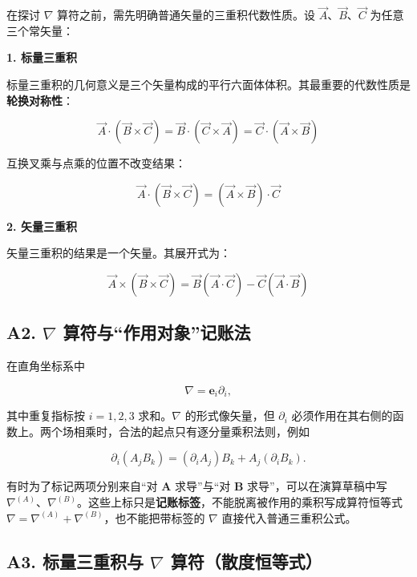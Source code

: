 在探讨 \(\nabla\) 算符之前，需先明确普通矢量的三重积代数性质。设
\(\vec{A}\)、\(\vec{B}\)、\(\vec{C}\) 为任意三个常矢量：

\textbf{1. 标量三重积}

标量三重积的几何意义是三个矢量构成的平行六面体体积。其最重要的代数性质是\textbf{轮换对称性}：

\[
\vec{A} \cdot (\vec{B} \times \vec{C}) = \vec{B} \cdot (\vec{C} \times \vec{A}) = \vec{C} \cdot (\vec{A} \times \vec{B})
\]

互换叉乘与点乘的位置不改变结果：

\[
\vec{A} \cdot (\vec{B} \times \vec{C}) = (\vec{A} \times \vec{B}) \cdot \vec{C}
\]

\textbf{2. 矢量三重积}

矢量三重积的结果是一个矢量。其展开式为：

\[
\vec{A} \times (\vec{B} \times \vec{C}) = \vec{B}(\vec{A} \cdot \vec{C}) - \vec{C}(\vec{A} \cdot \vec{B})
\]

\subsection{\texorpdfstring{A2. \(\nabla\)
算符与``作用对象''记账法}{A2. \textbackslash nabla 算符与``作用对象''记账法}}\label{m1:a2.-nabla-ux7b97ux7b26ux4e0eux4f5cux7528ux5bf9ux8c61ux8bb0ux8d26ux6cd5}

在直角坐标系中

\[
\nabla=\mathbf e_i\partial_i,
\]

其中重复指标按 \(i=1,2,3\) 求和。\(\nabla\) 的形式像矢量，但
\(\partial_i\)
必须作用在其右侧的函数上。两个场相乘时，合法的起点只有逐分量乘积法则，例如

\[
\partial_i(A_jB_k)=(\partial_iA_j)B_k+A_j(\partial_iB_k).
\]

有时为了标记两项分别来自``对 \(\mathbf A\) 求导''与``对 \(\mathbf B\)
求导''，可以在演算草稿中写
\(\nabla^{(A)}\)、\(\nabla^{(B)}\)。这些上标只是\textbf{记账标签}，不能脱离被作用的乘积写成算符恒等式
\(\nabla=\nabla^{(A)}+\nabla^{(B)}\)，也不能把带标签的 \(\nabla\)
直接代入普通三重积公式。

\subsection{\texorpdfstring{A3. 标量三重积与 \(\nabla\)
算符（散度恒等式）}{A3. 标量三重积与 \textbackslash nabla 算符（散度恒等式）}}\label{m1:a3.-ux6807ux91cfux4e09ux91cdux79efux4e0e-nabla-ux7b97ux7b26ux6563ux5ea6ux6052ux7b49ux5f0f}

